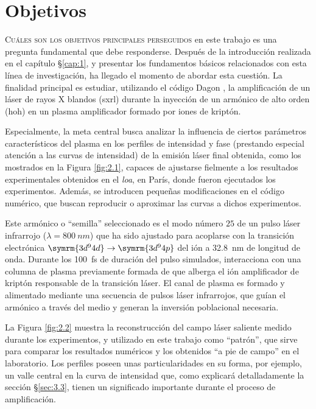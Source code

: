 \chapter{Objetivos}\label{cap:2}
\lettrine{C}{uáles son los objetivos principales perseguidos} en este trabajo es una pregunta fundamental que debe responderse. Después de la introducción realizada en el capítulo \S\ref{cap:1}, y presentar los fundamentos básicos relacionados con esta línea de investigación, ha llegado el momento de abordar esta cuestión. La finalidad principal es estudiar, utilizando el código Dagon \autocite{Oliva2017}, la amplificación de un láser de rayos X blandos (\acrshort{sxrl}) durante la inyección de un armónico de alto orden (\acrshort{hoh}) en un plasma amplificador formado por iones de kriptón.

Especialmente, la meta central busca analizar la influencia de ciertos parámetros característicos del plasma en los perfiles de intensidad y fase (prestando especial atención a las curvas de intensidad) de la emisión láser final obtenida, como los mostrados en la Figura \ref{fig:2.1}, capaces de ajustarse fielmente a los resultados experimentales obtenidos en el \emph{\acrfull{loa}}, en París, donde fueron ejecutados los experimentos. Además, se introducen pequeñas modificaciones en el código numérico, que buscan reproducir o aproximar las curvas a dichos experimentos.

Este armónico o \enquote{semilla} seleccionado es el modo número $25$ de un pulso láser infrarrojo ($\lambda = \qty{800}{nm}$) que ha sido ajustado para acoplarse con la transición electrónica $\symrm{3d^{9}4d} \rightarrow \symrm{3d^{9}4p}$ del ión  a \qty{32.8}{nm} de longitud de onda. Durante los \qty{100}{fs} de duración del pulso simulados, interacciona con una columna de plasma previamente formada de  que alberga el ión amplificador de kriptón  responsable de la transición láser. El canal de plasma es formado y alimentado mediante una secuencia de pulsos láser infrarrojos, que guían el armónico a través del medio y generan la inversión poblacional necesaria.

La Figura \ref{fig:2.2} muestra la reconstrucción del campo láser saliente medido durante los experimentos, y utilizado en este trabajo como \enquote{patrón}, que sirve para comparar los resultados numéricos y los obtenidos \enquote{a pie de campo} en el laboratorio. Los perfiles poseen unas particularidades en su forma, por ejemplo, un valle central en la curva de intensidad que, como explicará detalladamente la sección \S\ref{sec:3.3}, tienen un significado importante durante el proceso de amplificación.

